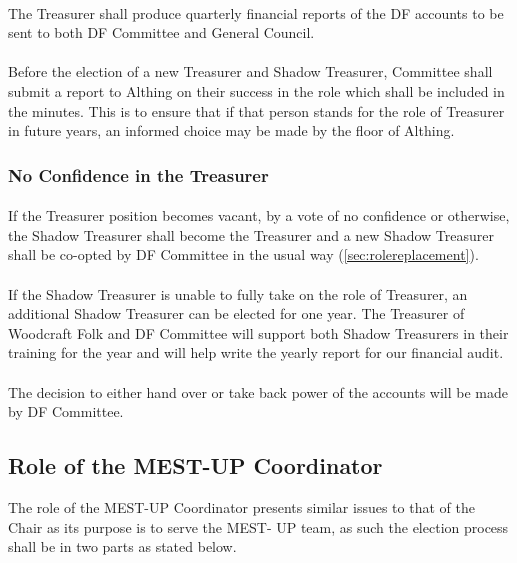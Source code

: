\documentclass[a4paper, 11pt]{report}
\begin{document}
\paragraph{}
The Treasurer shall produce quarterly financial reports of the DF accounts to be sent to both DF Committee and General Council.
\paragraph{}
\label{sec:treasurerreport}
Before the election of a new Treasurer and Shadow Treasurer, Committee shall submit a report to Althing on their success in the role which shall be included in the minutes. This is to ensure that if that person stands for the role of Treasurer in future years, an informed choice may be made by the floor of Althing.
\subsubsection{No Confidence in the Treasurer}
\label{sec:treasurernoconfidence}
\paragraph{} If the Treasurer position becomes vacant, by a vote of no confidence or otherwise, the Shadow Treasurer shall become the Treasurer and a new Shadow Treasurer shall be co-opted by DF Committee in the usual way (\ref{sec:rolereplacement}).
\paragraph{} If the Shadow Treasurer is unable to fully take on the role of Treasurer, an additional Shadow Treasurer can be elected for one year. The Treasurer of Woodcraft Folk and DF Committee will support both Shadow Treasurers in their training for the year and will help write the yearly report for our financial audit.
\paragraph{} The decision to either hand over or take back power of the accounts will be made by DF Committee.

\subsection{Role of the MEST-UP Coordinator}
\label{sec:mestup}

The role of the MEST-UP Coordinator presents similar issues to that of the Chair as its purpose is to serve the MEST- UP team, as such the election process shall be in two parts as stated below.
\end{document}
